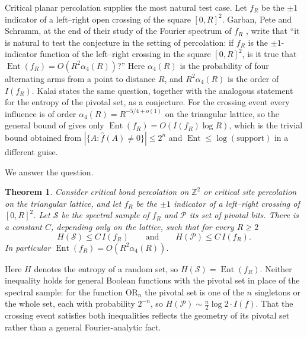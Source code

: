\documentclass[11pt]{amsart}
\newtheorem{theorem}{Theorem}[section]
\theoremstyle{remark}
\newcommand{\Ent}{\operatorname{Ent}}
\newcommand{\ZZ}{\mathbb{Z}}
\newcommand{\Sc}{\mathcal{S}}
\newcommand{\Pc}{\mathcal{P}}
\begin{document}
Critical planar percolation supplies the most natural test case. Let $f_R$ be the $\pm1$ indicator of a left--right open crossing of the square $[0,R]^2$. Garban, Pete and Schramm, at the end of their study of the Fourier spectrum of $f_R$ \cite[Section~11, Problem~1]{GPS10}, write that ``it is natural to test the conjecture in the setting of percolation: if $f_R$ is the $\pm1$-indicator function of the left--right crossing in the square $[0,R]^2$, is it true that $\Ent(f_R)=O(R^2\alpha_4(R))$?'' Here $\alpha_4(R)$ is the probability of four alternating arms from a point to distance $R$, and $R^2\alpha_4(R)$ is the order of $I(f_R)$. Kalai \cite[Conjecture~8]{Kal18} states the same question, together with the analogous statement for the entropy of the pivotal set, as a conjecture. For the crossing event every influence is of order $\alpha_4(R)=R^{-5/4+o(1)}$ on the triangular lattice, so the general bound of \cite{Combinatorica24} gives only $\Ent(f_R)=O(I(f_R)\log R)$, which is the trivial bound obtained from $|\{A:\hat f(A)\ne0\}|\le 2^{n}$ and $\Ent\le\log(\text{support})$ in a different guise.

We answer the question.

\begin{theorem}\label{thm:main}
Consider critical bond percolation on $\ZZ^2$ or critical site percolation on the triangular lattice, and let $f_R$ be the $\pm1$ indicator of a left--right crossing of $[0,R]^2$. Let $\Sc$ be the spectral sample of $f_R$ and $\Pc$ its set of pivotal bits. There is a constant $C$, depending only on the lattice, such that for every $R\ge2$
\[
H(\Sc)\le C\,I(f_R)\qquad\text{and}\qquad H(\Pc)\le C\,I(f_R).
\]
In particular $\Ent(f_R)=O(R^2\alpha_4(R))$.
\end{theorem}

Here $H$ denotes the entropy of a random set, so $H(\Sc)=\Ent(f_R)$. Neither inequality holds for general Boolean functions with the pivotal set in place of the spectral sample: for the function $\mathrm{OR}_n$ the pivotal set is one of the $n$ singletons or the whole set, each with probability $2^{-n}$, so $H(\Pc)\sim \tfrac{n}{2}\log 2\cdot I(f)$. That the crossing event satisfies both inequalities reflects the geometry of its pivotal set rather than a general Fourier-analytic fact.
\end{document}

